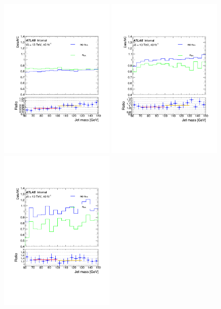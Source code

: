 \begin{figure}[htbp!]
\begin{center}
    \includegraphics[width=0.49\textwidth]{anybtag.pdf}
    \includegraphics[width=0.49\textwidth]{1btag.pdf} \\
    \includegraphics[width=0.49\textwidth]{2btag.pdf}

\end{center}
\end{figure}
